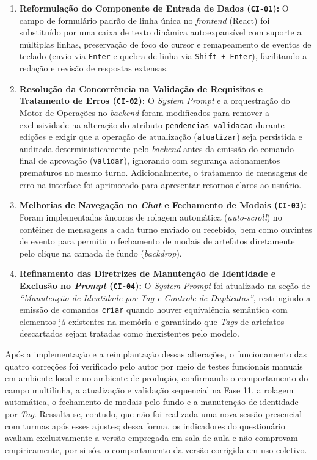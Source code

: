 \begin{enumerate}
    \item \textbf{Reformulação do Componente de Entrada de Dados (\texttt{CI-01}):} O campo de formulário padrão de linha única no \textit{frontend} (React) foi substituído por uma caixa de texto dinâmica autoexpansível com suporte a múltiplas linhas, preservação de foco do cursor e remapeamento de eventos de teclado (envio via \texttt{Enter} e quebra de linha via \texttt{Shift + Enter}), facilitando a redação e revisão de respostas extensas.
    \item \textbf{Resolução da Concorrência na Validação de Requisitos e Tratamento de Erros (\texttt{CI-02}):} O \textit{System Prompt} e a orquestração do Motor de Operações no \textit{backend} foram modificados para remover a exclusividade na alteração do atributo \texttt{pendencias\_validacao} durante edições e exigir que a operação de atualização (\texttt{atualizar}) seja persistida e auditada deterministicamente pelo \textit{backend} antes da emissão do comando final de aprovação (\texttt{validar}), ignorando com segurança acionamentos prematuros no mesmo turno. Adicionalmente, o tratamento de mensagens de erro na interface foi aprimorado para apresentar retornos claros ao usuário.
    \item \textbf{Melhorias de Navegação no \textit{Chat} e Fechamento de Modais (\texttt{CI-03}):} Foram implementadas âncoras de rolagem automática (\textit{auto-scroll}) no contêiner de mensagens a cada turno enviado ou recebido, bem como ouvintes de evento para permitir o fechamento de modais de artefatos diretamente pelo clique na camada de fundo (\textit{backdrop}).
    \item \textbf{Refinamento das Diretrizes de Manutenção de Identidade e Exclusão no \textit{Prompt} (\texttt{CI-04}):} O \textit{System Prompt} foi atualizado na seção de \textit{``Manutenção de Identidade por Tag e Controle de Duplicatas''}, restringindo a emissão de comandos \texttt{criar} quando houver equivalência semântica com elementos já existentes na memória e garantindo que \textit{Tags} de artefatos descartados sejam tratadas como inexistentes pelo modelo.
\end{enumerate}

Após a implementação e a reimplantação dessas alterações, o funcionamento das quatro correções foi verificado pelo autor por meio de testes funcionais manuais em ambiente local e no ambiente de produção, confirmando o comportamento do campo multilinha, a atualização e validação sequencial na Fase 11, a rolagem automática, o fechamento de modais pelo fundo e a manutenção de identidade por \textit{Tag}. Ressalta-se, contudo, que não foi realizada uma nova sessão presencial com turmas após esses ajustes; dessa forma, os indicadores do questionário avaliam exclusivamente a versão empregada em sala de aula e não comprovam empiricamente, por si sós, o comportamento da versão corrigida em uso coletivo.


